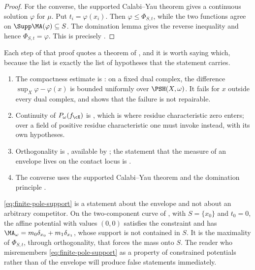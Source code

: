\begin{proof}
For the converse, the supported Calabi--Yau theorem gives a continuous
solution $\varphi$ for $\mu$.  Put $t_i=\varphi(x_i)$.  Then
$\varphi\leq\Phi_{S,t}$, while the two functions agree on
$\Supp\MA(\varphi)\subseteq S$.  The domination lemma gives the reverse
inequality and hence $\Phi_{S,t}=\varphi$.  This is precisely
\cite[Lemma~8.5 and Proposition~8.6]{BFJ15}.
\end{proof}

Each step of that proof quotes a theorem of , and it is worth
saying which, because the list is exactly the list of hypotheses that the
statement carries.

\begin{enumerate}
\item\label{itm:ch31-pole:compact}
 The compactness estimate is
 : on a fixed dual complex, the
 difference $\sup_X\varphi-\varphi(x)$ is bounded uniformly over
 $\PSH(X,\omega)$.  It fails for $x$ outside every dual complex, and
  shows that the failure is not repairable.
\item\label{itm:ch31-pole:envelope}
 Continuity of $P_\omega(f_{\cX})$ is
 , which is where residue characteristic
 zero enters; over a field of positive residue characteristic one must
 invoke  instead, with its own
 hypotheses.
\item\label{itm:ch31-pole:orth}
 Orthogonality is , available by
 ; the statement that the measure of an
 envelope lives on the contact locus is
 .
\item\label{itm:ch31-pole:cy}
 The converse uses the supported Calabi--Yau theorem
  and the domination principle
 .
\end{enumerate}

\begin{remark}
\label{rem:ch31-why-supremum}
\eqref{eq:finite-pole-support} is a statement about the envelope and not
about an arbitrary competitor.  On the two-component curve of
, with $S=\{x_0\}$ and $t_0=0$, the
affine potential with values $(0,0)$ satisfies the constraint and has
$\MA_\omega=m_0\delta_{x_0}+m_1\delta_{x_1}$, whose support is not
contained in $S$.  It is the maximality of $\Phi_{S,t}$, through
orthogonality, that forces the mass onto $S$.  The reader who
misremembers \eqref{eq:finite-pole-support} as a property of constrained
potentials rather than of the envelope will produce false statements
immediately.
\end{remark}

